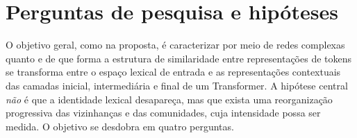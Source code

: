 \section{Perguntas de pesquisa e hipóteses}\label{sec:perguntas}

O objetivo geral, como na proposta, é caracterizar por meio de redes complexas quanto e de que
forma a estrutura de similaridade entre representações de tokens se transforma entre o espaço
lexical de entrada e as representações contextuais das camadas inicial, intermediária e final
de um Transformer. A hipótese central \emph{não} é que a identidade lexical desapareça, mas que
exista uma reorganização progressiva das vizinhanças e das comunidades, cuja intensidade possa
ser medida. O objetivo se desdobra em quatro perguntas.


